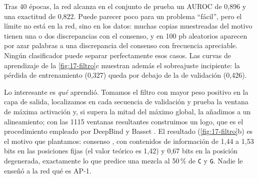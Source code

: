 Tras 40 épocas, la red alcanza en el conjunto de prueba un AUROC de 0,896 y una exactitud de 0,822. Puede parecer poco para un problema ``fácil'', pero el límite no está en la red, sino en los datos: muchas copias muestreadas del motivo tienen una o dos discrepancias con el consenso, y en 100 pb aleatorios aparecen por azar palabras a una discrepancia del consenso con frecuencia apreciable. Ningún clasificador puede separar perfectamente esos casos. Las curvas de aprendizaje de la \cref{fig:17-filtro}c muestran además el sobreajuste incipiente: la pérdida de entrenamiento (0,327) queda por debajo de la de validación (0,426).

Lo interesante es \emph{qué} aprendió. Tomamos el filtro con mayor peso positivo en la capa de salida, localizamos en cada secuencia de validación y prueba la ventana de máxima activación y, si supera la mitad del máximo global, la añadimos a un alineamiento; con las \num{1115} ventanas resultantes construimos un logo, que es el procedimiento empleado por DeepBind y Basset \parencite{c17-alipanahi2015,c17-kelley2016}. El resultado (\cref{fig:17-filtro}b) es el motivo que plantamos: consenso , con contenidos de información de 1,44 a 1,53 bits en las posiciones fijas (el valor teórico es 1,42) y 0,67 bits en la posición degenerada, exactamente lo que predice una mezcla al 50\,\% de \texttt{C} y \texttt{G}. Nadie le enseñó a la red qué es AP-1.

